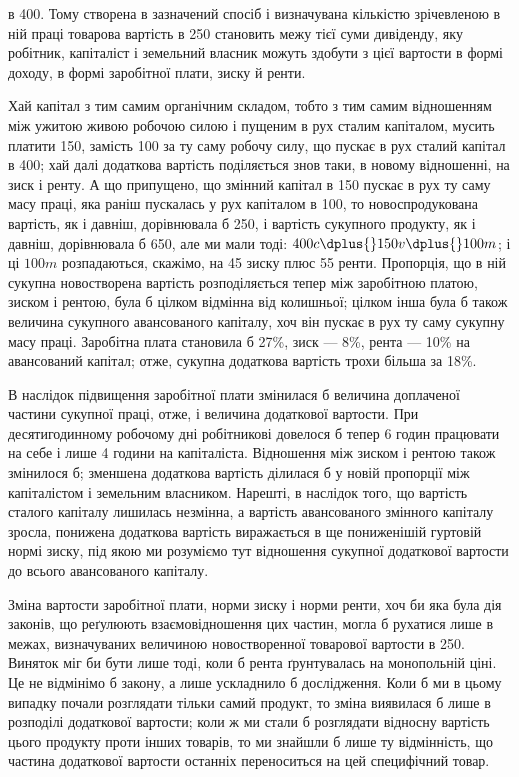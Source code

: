 \parcont{}  %
в 400. Тому створена в зазначений спосіб і визначувана кількістю зрічевленою
в ній праці товарова вартість в 250 становить межу тієї суми дивіденду,
яку робітник, капіталіст і земельний власник можуть здобути з цієї вартости
в формі доходу, в формі заробітної плати, зиску й ренти.

Хай капітал з тим самим органічним складом, тобто з тим самим відношенням
між ужитою живою робочою силою і пущеним в рух сталим капіталом,
мусить платити 150, замість 100 за ту саму робочу силу,
що пускає в рух сталий капітал в 400; хай далі додаткова вартість поділяється
знов таки, в новому відношенні, на зиск і ренту. А що припущено,
що змінний капітал в 150 пускає в рух ту саму масу праці,
яка раніш пускалась у рух капіталом в 100, то новоспродукована вартість, як
і давніш, дорівнювала б 250, і вартість сукупного продукту, як і давніш, дорівнювала
б 650, але ми мали тоді: $400c \dplus{} 150v \dplus{} 100m$; і ці $100m$ розпадаються,
скажімо, на 45 зиску плюс 55 ренти. Пропорція, що в ній сукупна новостворена
вартість розподіляється тепер між заробітною платою, зиском і рентою,
була б цілком відмінна від колишньої; цілком інша була б також величина
сукупного авансованого капіталу, хоч він пускає в рух ту саму сукупну масу
праці. Заробітна плата становила б 27\%, зиск — 8\%, рента — 10\% на
авансований капітал; отже, сукупна додаткова вартість трохи більша за 18\%.

В наслідок підвищення заробітної плати змінилася б величина доплаченої
частини сукупної праці, отже, і величина додаткової вартости. При десятигодинному
робочому дні робітникові довелося б тепер 6 годин працювати на
себе і лише 4 години на капіталіста. Відношення між зиском і рентою також
змінилося б; зменшена додаткова вартість ділилася б у новій пропорції між
капіталістом і земельним власником. Нарешті, в наслідок того, що вартість
сталого капіталу лишилась незмінна, а вартість авансованого змінного капіталу
зросла, понижена додаткова вартість виражається в ще пониженішій гуртовій
нормі зиску, під якою ми розуміємо тут відношення сукупної додаткової вартости
до всього авансованого капіталу.

Зміна вартости заробітної плати, норми зиску і норми ренти, хоч би яка
була дія законів, що реґулюють взаємовідношення цих частин, могла б рухатися
лише в межах, визначуваних величиною новостворенної товарової вартости
в 250. Виняток міг би бути лише тоді, коли б рента ґрунтувалась на
монопольній ціні. Це не відмінімо б закону, а лише ускладнило б дослідження.
Коли б ми в цьому випадку почали розглядати тільки самий продукт, то зміна
виявилася б лише в розподілі додаткової вартости; коли ж ми стали б розглядати
відносну вартість цього продукту проти інших товарів, то ми знайшли б
лише ту відмінність, що частина додаткової вартости останніх переноситься на
цей специфічний товар.

